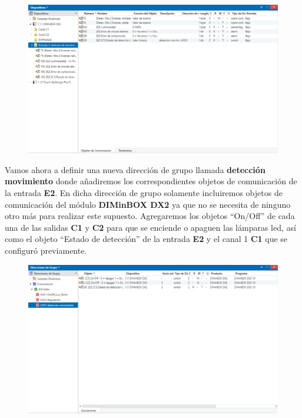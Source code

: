 \documentclass[10pt]{article}
\begin{document}
\begin{figure}[H]
	\begin{center}
	 		\includegraphics[width = 1.00\textwidth]{Imagenes/img17}
	\end{center} 
\end{figure}

Vamos ahora a definir una nueva dirección de grupo llamada \textbf{detección movimiento} donde añadiremos los correspondientes objetos de comunicación de la entrada \textbf{E2}. En dicha dirección de grupo solamente incluiremos objetos de comunicación del módulo \textbf{DIMinBOX DX2} ya que no se necesita de ninguno otro más para realizar este supuesto. Agregaremos los objetos ``On/Off'' de cada una de las salidas \textbf{C1} y \textbf{C2} para que se enciende o apaguen las lámparas led, así como el objeto ``Estado de detección'' de la entrada \textbf{E2} y el canal 1 \textbf{C1} que se configuró previamente. \\

\begin{figure}[H]
	\begin{center}
	 		\includegraphics[width = 1.00\textwidth]{Imagenes/img18}
	\end{center} 
\end{figure}
\end{document}
